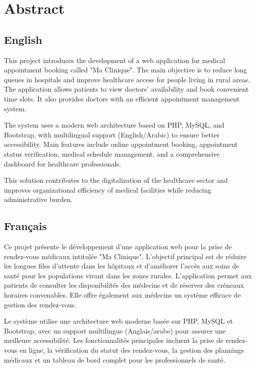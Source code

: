 \documentclass[12pt,a4paper]{report}
\begin{document}
\chapter*{Abstract}

\section*{English}
This project introduces the development of a web application for medical appointment booking called "Ma Clinique". The main objective is to reduce long queues in hospitals and improve healthcare access for people living in rural areas. The application allows patients to view doctors' availability and book convenient time slots. It also provides doctors with an efficient appointment management system.

The system uses a modern web architecture based on PHP, MySQL, and Bootstrap, with multilingual support (English/Arabic) to ensure better accessibility. Main features include online appointment booking, appointment status verification, medical schedule management, and a comprehensive dashboard for healthcare professionals.

This solution contributes to the digitalization of the healthcare sector and improves organizational efficiency of medical facilities while reducing administrative burden.

\section*{Français}
Ce projet présente le développement d'une application web pour la prise de rendez-vous médicaux intitulée "Ma Clinique". L'objectif principal est de réduire les longues files d'attente dans les hôpitaux et d'améliorer l'accès aux soins de santé pour les populations vivant dans les zones rurales. L'application permet aux patients de consulter les disponibilités des médecins et de réserver des créneaux horaires convenables. Elle offre également aux médecins un système efficace de gestion des rendez-vous.

Le système utilise une architecture web moderne basée sur PHP, MySQL et Bootstrap, avec un support multilingue (Anglais/arabe) pour assurer une meilleure accessibilité. Les fonctionnalités principales incluent la prise de rendez-vous en ligne, la vérification du statut des rendez-vous, la gestion des plannings médicaux et un tableau de bord complet pour les professionnels de santé.
\end{document}
